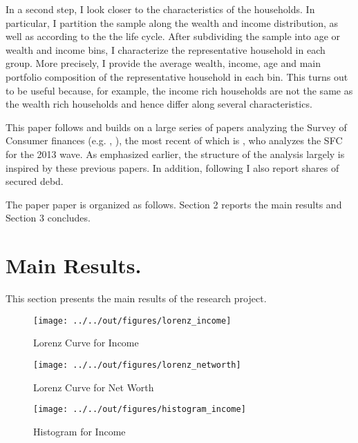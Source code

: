 \documentclass[11pt, a4paper, leqno]{article}
\begin{document}
    In a second step, I look closer to the characteristics of the households. In particular, I partition the sample along the wealth and income distribution, as well as according to the the life cycle. After subdividing the sample into age or wealth and income bins, I characterize the representative household in each group. More precisely, I provide the average wealth, income, age and main portfolio composition of the representative household in each bin. This turns out to be useful because, for example, the income rich households are not the same as the wealth rich households and hence differ along several characteristics. 

    This paper follows and builds on a large series of papers analyzing the Survey of Consumer finances (e.g. \citet{Diaz-Gimenez1997}, \citet{Diaz-Gimenez2011}), the most recent of which is \citet{Kuhn2016}, who analyzes the SFC for the 2013 wave. As emphasized earlier, the structure of the analysis largely is inspired by these previous papers. In addition, following \citet{Hintermaier2016} I also report shares of secured debd.

    The paper paper is organized as follows. Section 2 reports the main results and Section 3 concludes.


\section{Main Results.}
\label{sec:mainresults}

This section presents the main results of the research project.
\begin{figure}
    \caption{Lorenz Curve for Income}
    
    \texttt{[image: ../../out/figures/lorenz\_income]}
    \label{fig:lorincome}
\end{figure}


\begin{figure}
    \caption{Lorenz Curve for Net Worth}
    
    \texttt{[image: ../../out/figures/lorenz\_networth]}
    \label{fig:lornetworth}

\end{figure}

\begin{figure}
    \caption{Histogram for Income}
    
    \texttt{[image: ../../out/figures/histogram\_income]}
    \label{fig:histincome}
\end{figure}
\end{document}
